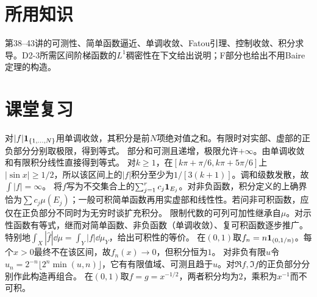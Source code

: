 \documentclass[UTF8,fontset=fandol,11pt]{ctexart}
\begin{document}
\section*{所用知识}
第38--43讲的可测性、简单函数逼近、单调收敛、Fatou引理、控制收敛、积分求导。D2-3所需区间阶梯函数的$L^1$稠密性在下文给出说明；F部分也给出不用Baire定理的构造。
\section{课堂复习}
对$|f|\mathbf1_{\{1,\ldots,N\}}$用单调收敛，其积分是前$N$项绝对值之和。有限时对实部、虚部的正负部分分别取极限，得到等式。
部分和可测且递增，极限允许$+\infty$。由单调收敛和有限积分线性直接得到等式。
对$k\ge1$，在$[k\pi+\pi/6,k\pi+5\pi/6]$上$|\sin x|\ge1/2$，所以该区间上的$|f|$积分至少为$1/[3(k+1)]$。调和级数发散，故$\int|f|=\infty$。
将$f$写为不交集合上的$\sum_{j=1}^r c_j\mathbf1_{E_j}$。对非负函数，积分定义的上确界恰为$\sum c_j\mu(E_j)$；一般可积简单函数再用实虚部和线性性。若问非可积函数，应仅在正负部分不同时为无穷时谈扩充积分。
限制代数的可列可加性继承自$\mu$。对示性函数有等式，继而对简单函数、非负函数（单调收敛）、复可积函数逐步推广。特别地$\int_X|\widehat f|\dd\mu=\int_Y|f|\dd\mu_Y$，给出可积性的等价。
在$(0,1)$取$f_n=n\mathbf1_{(0,1/n)}$。每个$x>0$最终不在该区间，故$f_n(x)\to0$，但积分恒为$1$。
对非负有限$u$令$u_n=2^{-n}\lfloor2^n\min(u,n)\rfloor$，它有有限值域、可测且趋于$u$。对$\Re f,\Im f$的正负部分分别作此构造再组合。
在$(0,1)$取$f=g=x^{-1/2}$，两者积分均为$2$，乘积为$x^{-1}$而不可积。
\end{document}
